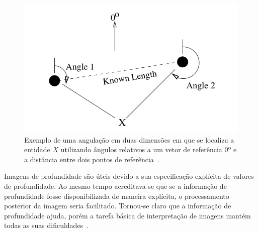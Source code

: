 	\begin{figure}[hbt]
		\begin{center}
			\includegraphics[scale=0.4]{figuras/2.FundamentacaoTeorica/angulation.png}
		\end{center}
		\caption{Exemplo de uma angulação em duas dimensões em que se localiza a entidade $\displaystyle X$ utilizando ângulos relativos a um vetor de referência $\displaystyle 0º$ e a distância entre dois pontos de referência~\cite{triangulacao}.}
		\label{angulation}
	\end{figure}


	Imagens de profundidade são úteis devido a sua especificação explícita de valores de profundidade. Ao mesmo tempo acreditava-se que se a informação de profundidade fosse disponibilizada de maneira explícita, o processamento posterior da imagem seria facilitado. Tornou-se claro que a informação de profundidade ajuda, porém a tarefa básica de interpretação de imagens mantém todas as suas dificuldades~\cite{jain}.


